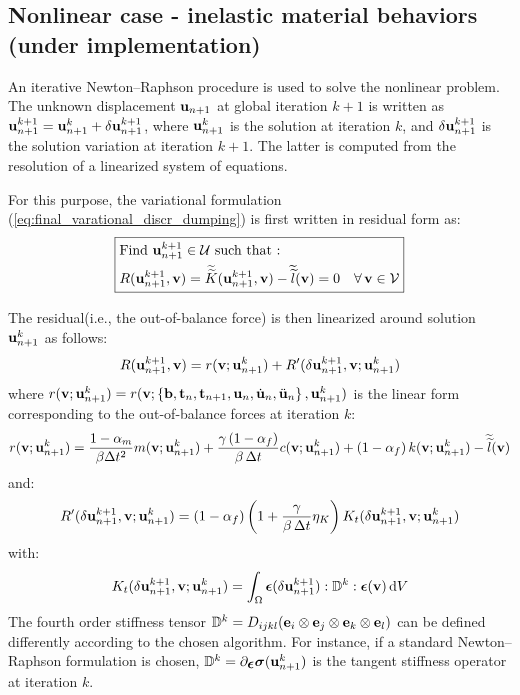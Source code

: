 \documentclass{report}
\newcommand{\bb}{\textbf{b}}
\newcommand{\bu}{\textbf{u}}
\newcommand{\bv}{\textbf{v}}
\newcommand{\bt}{\boldsymbol t}
\def\bepsilon{\mbox{\boldmath${\epsilon}$}}
\def\bsigma{\mbox{\boldmath${\sigma}$}}
\def\bb{{\bf{b}}}
\def\be{{\bf e}}
\def\be{{\bf{e}}}
\def\bt{{\bf t}}
\def\bu{{\bf{u}}}
\def\bv{{\bf{v}}}
\begin{document}
\subsection{Nonlinear case - inelastic material behaviors (under implementation)}

An iterative Newton--Raphson procedure is used to solve the nonlinear
problem. The unknown displacement ${\bu_{n+1}}$ at global iteration
$k+1$ is written as ${\bu_{n+1}^{k+1}}={\bu_{n+1}^{k}}+\delta{\bu_{n+1}^{k+1}}$,
where ${\bu_{n+1}^{k}}$ is the solution at iteration $k$, and $\delta{\bu_{n+1}^{k+1}}$
is the solution variation at iteration $k+1$. The latter is computed
from the resolution of a linearized system of equations. 

For this purpose, the variational formulation (\ref{eq:final_varational_discr_dumping}) is first written in residual form as:
\begin{equation}
\boxed{\begin{aligned} & \text{Find \ensuremath{{\bu_{n+1}^{k+1}}\ensuremath{\in}\ensuremath{\mathcal{U}}} such that : }\\
 & R({\bu_{n+1}^{k+1}},\bv)=\widetilde{\widetilde{K}}(\bu_{n+1}^{k+1},\bv)-\widetilde{\widetilde{l}}(\bv)=0\quad\text{\ensuremath{\forall\,}}\bv\in\mathcal{V}
\end{aligned}
}
\end{equation}

The residual(i.e., the out-of-balance force) is then linearized around solution ${\bu_{n+1}^{k}}$
as follows:
\begin{equation}
R({\bu_{n+1}^{k+1}},\bv)=r(\bv;\bu_{n+1}^{k})+R'(\delta{\bu_{n+1}^{k+1}},\bv;\bu_{n+1}^{k})\label{eq:linearization_1-1}
\end{equation}
where $r(\bv;\bu_{n+1}^{k})=r(\bv;\left\{ \bb,\bt_{n},\bt_{n+1},\bu_{n},\dot{\bu}_{n},\ddot{\bu}_{n}\right\} ,\bu_{n+1}^{k})$
is the linear form corresponding to the out-of-balance forces at iteration
$k$:
\begin{equation}
r(\bv;\bu_{n+1}^{k})=\frac{1-\alpha_{m}}{\beta\Delta t^{2}}m(\bv;\bu_{n+1}^{k})+\frac{\gamma\,(1-\alpha_{f})}{\beta\,\Delta t}c(\bv;\bu_{n+1}^{k})+\left(1-\alpha_{f}\right)k(\bv;\bu_{n+1}^{k})-\widetilde{\widetilde{l}}(\bv)\label{eq:nl_residual}
\end{equation}
and:
\begin{equation}
R'(\delta{\bu_{n+1}^{k+1}},\bv;\bu_{n+1}^{k})=(1-\alpha_{f})\left(1+\frac{\gamma}{\beta\,\Delta t}\eta_{K}\right)K_{t}(\delta{\bu_{n+1}^{k+1}},\bv;\bu_{n+1}^{k})\label{eq:linearization_1}
\end{equation}
with:
\begin{equation}
K_{t}(\delta{\bu_{n+1}^{k+1}},\bv;\bu_{n+1}^{k})=\int_{\Omega}\bepsilon(\delta{\bu_{n+1}^{k+1}}):\mathbb{D}^{k}:\bepsilon(\bv)\,{\rm d}V
\end{equation}
The fourth order stiffness tensor $\mathbb{D}^{k}=D_{ijkl}(\be_{i}\otimes\be_{j}\otimes\be_{k}\otimes\be_{l})$
can be defined differently according to the chosen algorithm. For
instance, if a standard Newton--Raphson formulation is chosen, $\mathbb{D}^{k}=\partial_{\bepsilon}\bsigma({\bu_{n+1}^{k}})$
is the tangent stiffness operator at iteration $k$.
\end{document}
